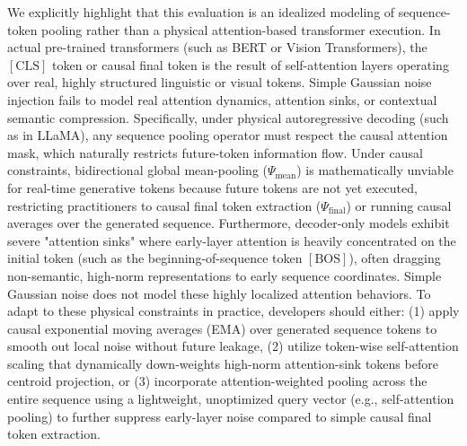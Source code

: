 We explicitly highlight that this evaluation is an idealized modeling of sequence-token pooling rather than a physical attention-based transformer execution. In actual pre-trained transformers (such as BERT or Vision Transformers), the $[\text{CLS}]$ token or causal final token is the result of self-attention layers operating over real, highly structured linguistic or visual tokens. Simple Gaussian noise injection fails to model real attention dynamics, attention sinks, or contextual semantic compression. Specifically, under physical autoregressive decoding (such as in LLaMA), any sequence pooling operator must respect the causal attention mask, which naturally restricts future-token information flow. Under causal constraints, bidirectional global mean-pooling ($\Psi_{\text{mean}}$) is mathematically unviable for real-time generative tokens because future tokens are not yet executed, restricting practitioners to causal final token extraction ($\Psi_{\text{final}}$) or running causal averages over the generated sequence. Furthermore, decoder-only models exhibit severe "attention sinks" where early-layer attention is heavily concentrated on the initial token (such as the beginning-of-sequence token $[\text{BOS}]$), often dragging non-semantic, high-norm representations to early sequence coordinates. Simple Gaussian noise does not model these highly localized attention behaviors. To adapt to these physical constraints in practice, developers should either: (1) apply causal exponential moving averages (EMA) over generated sequence tokens to smooth out local noise without future leakage, (2) utilize token-wise self-attention scaling that dynamically down-weights high-norm attention-sink tokens before centroid projection, or (3) incorporate attention-weighted pooling across the entire sequence using a lightweight, unoptimized query vector (e.g., self-attention pooling) to further suppress early-layer noise compared to simple causal final token extraction.

